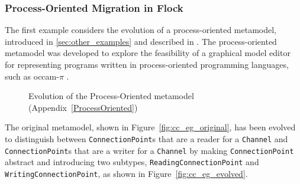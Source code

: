 \subsubsection{Process-Oriented Migration in Flock}
The first example considers the evolution of a process-oriented metamodel, introduced in \ref{sec:other_examples} and described in . The process-oriented metamodel was developed to explore the feasibility of a graphical model editor for representing programs written in process-oriented programming languages, such as occam-$\pi$ \cite{occam_pi}.

\begin{figure}
	\centering
	\caption[Evolution of the Process-Oriented metamodel]{Evolution of the Process-Oriented metamodel (Appendix~\ref{ProcessOriented})}
\label{fig:cc_eg_mms}
\end{figure}

The original metamodel, shown in Figure~\ref{fig:cc_eg_original}, has been evolved to distinguish between \texttt{Co\-nn\-ec\-ti\-o\-nP\-oi\-nt}s that are a reader for a \texttt{Ch\-an\-n\-el} and \texttt{Co\-nn\-ec\-ti\-o\-nP\-oi\-nt}s that are a writer for a \texttt{Ch\-an\-n\-el} by making \texttt{Co\-nn\-ec\-ti\-o\-nP\-oi\-nt} abstract and introducing two subtypes, \texttt{Re\-a\-di\-ngCo\-nn\-ec\-ti\-o\-nP\-oi\-nt} and \texttt{Wr\-i\-ti\-ngCo\-nn\-ec\-ti\-o\-nP\-oi\-nt}, as shown in Figure~\ref{fig:cc_eg_evolved}.

